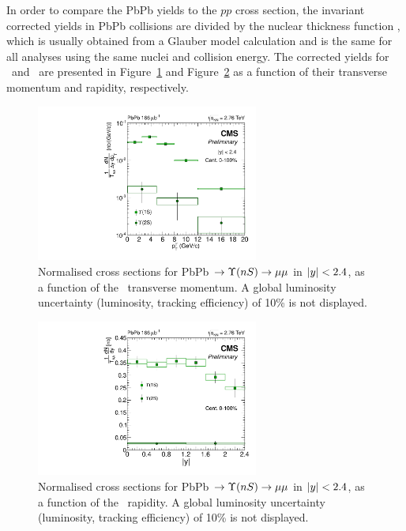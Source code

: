 In order to compare the PbPb yields to the $pp$ cross
section, the invariant corrected yields in PbPb collisions are divided
by the nuclear thickness function \TAA, which is usually obtained from
a Glauber model calculation and is the same for all analyses using the
same nuclei and collision
energy. %
The corrected yields for \PgUa\ and \PgUb\ are presented in
Figure~\ref{fig:PbPbCrossSections_pt} and
Figure~\ref{fig:PbPbCrossSections_y} as a function of their transverse
momentum and rapidity, respectively.


\begin{figure}[h]
  \begin{centering}  
    \includegraphics[width=0.65\textwidth]{Chapters/aUpsilon/CS_AAPt.pdf}
    \caption{Normalised cross sections for PbPb $\to \Upsilon(nS) \to \mu\mu$ in $\vert y\vert < 2.4$, as a function of the \PgU\ transverse momentum. A global luminosity uncertainty (luminosity, tracking efficiency) of 10\% is not displayed.}
    \label{fig:PbPbCrossSections_pt}
  \end{centering}  
\end{figure}

\begin{figure}[h]
  \begin{centering}  
    \includegraphics[width=0.65\textwidth]{Chapters/aUpsilon/CS_AA_Rap_lin.pdf}
    \caption{Normalised cross sections for PbPb $\to \Upsilon(nS) \to \mu\mu$ in $\vert y\vert < 2.4$, as a function of the \PgU\ rapidity. A global luminosity uncertainty (luminosity, tracking efficiency) of 10\% is not displayed.}
    \label{fig:PbPbCrossSections_y}
  \end{centering}  
\end{figure}

